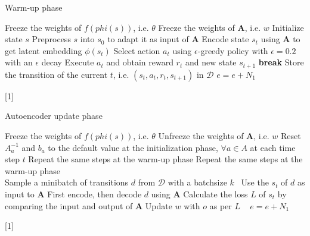\documentclass[a4paper,12pt,oneside]{article}
\numberwithin{equation}{section}
\begin{document}
    \clearpage
    \begin{algorithm}
    \caption{Warm-up phase}
        \begin{algorithmic}[1]
            \State Freeze the weights of \(f(phi(s))\), i.e. $\theta$
            \State Freeze the weights of $\mathbf{A}$, i.e. \(w\)
            \State Initialize state \(s\) 
            \State Preprocess \(s\) into \(s_0\) to adapt it as input of $\mathbf{A}$
                \State Encode state \(s_t\) using $\mathbf{A}$ to get latent embedding $\phi(s_t)$
                \State Select action $a_t$ using $\epsilon$-greedy policy with $\epsilon=0.2$ with an $\epsilon$ decay
                \State Execute $a_t$ and obtain reward $r_t$ and new state $s_{t+1}$
                    \State \textbf{break}
                \EndIf
                \State Store the transition of the current \(t\), i.e. $(s_t, a_t, r_t, s_{t+1})$ in $\mathcal{D}$
            \EndFor
        \EndFor
        \State $e=e+N_1$
        \end{algorithmic}[1]
    \end{algorithm}
    
    \clearpage
    \begin{algorithm}
    \caption{Autoencoder update phase}
        \begin{algorithmic}[1]
            \State Freeze the weights of \(f(phi(s))\), i.e. $\theta$
            \State Unfreeze the weights of $\mathbf{A}$, i.e. \(w\)
            \State Reset \(A_a^{-1}\) and \(b_a\) to the default value at the initialization phase, $\forall a \in A$ at each time step $t$
            \State Repeat the same steps at the warm-up phase
                \State Repeat the same steps at the warm-up phase
                \\
                \State Sample a minibatch of transitions \(d\) from $\mathcal{D}$ with a batchsize \(k\) \
                \State Use the \(s_t\) of \(d\) as input to $\mathbf{A}$
                \State First encode, then decode \(d\) using $\mathbf{A}$
                \State Calculate the loss \(L\) of \(s_t\) by comparing the input and output of $\mathbf{A}$
                \State Update \(w\) with \(o\) as per \(L\)
                \
            \EndFor
        \EndFor
        \State $e=e+N_1$
        \end{algorithmic}[1]
    \end{algorithm}
\end{document}
